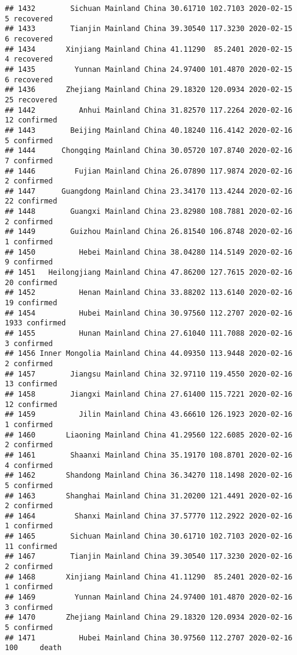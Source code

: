 \documentclass[
]{article}
\begin{document}
\begin{verbatim}
## 1432        Sichuan Mainland China 30.61710 102.7103 2020-02-15     5 recovered
## 1433        Tianjin Mainland China 39.30540 117.3230 2020-02-15     6 recovered
## 1434       Xinjiang Mainland China 41.11290  85.2401 2020-02-15     4 recovered
## 1435         Yunnan Mainland China 24.97400 101.4870 2020-02-15     6 recovered
## 1436       Zhejiang Mainland China 29.18320 120.0934 2020-02-15    25 recovered
## 1442          Anhui Mainland China 31.82570 117.2264 2020-02-16    12 confirmed
## 1443        Beijing Mainland China 40.18240 116.4142 2020-02-16     5 confirmed
## 1444      Chongqing Mainland China 30.05720 107.8740 2020-02-16     7 confirmed
## 1446         Fujian Mainland China 26.07890 117.9874 2020-02-16     2 confirmed
## 1447      Guangdong Mainland China 23.34170 113.4244 2020-02-16    22 confirmed
## 1448        Guangxi Mainland China 23.82980 108.7881 2020-02-16     2 confirmed
## 1449        Guizhou Mainland China 26.81540 106.8748 2020-02-16     1 confirmed
## 1450          Hebei Mainland China 38.04280 114.5149 2020-02-16     9 confirmed
## 1451   Heilongjiang Mainland China 47.86200 127.7615 2020-02-16    20 confirmed
## 1452          Henan Mainland China 33.88202 113.6140 2020-02-16    19 confirmed
## 1454          Hubei Mainland China 30.97560 112.2707 2020-02-16  1933 confirmed
## 1455          Hunan Mainland China 27.61040 111.7088 2020-02-16     3 confirmed
## 1456 Inner Mongolia Mainland China 44.09350 113.9448 2020-02-16     2 confirmed
## 1457        Jiangsu Mainland China 32.97110 119.4550 2020-02-16    13 confirmed
## 1458        Jiangxi Mainland China 27.61400 115.7221 2020-02-16    12 confirmed
## 1459          Jilin Mainland China 43.66610 126.1923 2020-02-16     1 confirmed
## 1460       Liaoning Mainland China 41.29560 122.6085 2020-02-16     2 confirmed
## 1461        Shaanxi Mainland China 35.19170 108.8701 2020-02-16     4 confirmed
## 1462       Shandong Mainland China 36.34270 118.1498 2020-02-16     5 confirmed
## 1463       Shanghai Mainland China 31.20200 121.4491 2020-02-16     2 confirmed
## 1464         Shanxi Mainland China 37.57770 112.2922 2020-02-16     1 confirmed
## 1465        Sichuan Mainland China 30.61710 102.7103 2020-02-16    11 confirmed
## 1467        Tianjin Mainland China 39.30540 117.3230 2020-02-16     2 confirmed
## 1468       Xinjiang Mainland China 41.11290  85.2401 2020-02-16     1 confirmed
## 1469         Yunnan Mainland China 24.97400 101.4870 2020-02-16     3 confirmed
## 1470       Zhejiang Mainland China 29.18320 120.0934 2020-02-16     5 confirmed
## 1471          Hubei Mainland China 30.97560 112.2707 2020-02-16   100     death

\end{verbatim}
\end{document}
